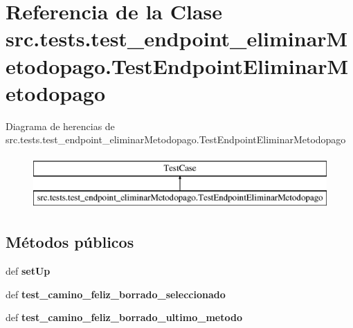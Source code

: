\hypertarget{classsrc_1_1tests_1_1test__endpoint__eliminar_metodopago_1_1_test_endpoint_eliminar_metodopago}{\section{Referencia de la Clase src.\-tests.\-test\-\_\-endpoint\-\_\-eliminar\-Metodopago.\-Test\-Endpoint\-Eliminar\-Metodopago}
\label{classsrc_1_1tests_1_1test__endpoint__eliminar_metodopago_1_1_test_endpoint_eliminar_metodopago}
}
Diagrama de herencias de src.\-tests.\-test\-\_\-endpoint\-\_\-eliminar\-Metodopago.\-Test\-Endpoint\-Eliminar\-Metodopago\begin{figure}[H]
\begin{center}
\leavevmode
\includegraphics[height=2.000000cm]{classsrc_1_1tests_1_1test__endpoint__eliminar_metodopago_1_1_test_endpoint_eliminar_metodopago}
\end{center}
\end{figure}
\subsection*{Métodos públicos}
\begin{DoxyCompactItemize}
\item 
\hypertarget{classsrc_1_1tests_1_1test__endpoint__eliminar_metodopago_1_1_test_endpoint_eliminar_metodopago_ac2cf7471b5e0f405b1380085baf73551}{def {\bfseries set\-Up}}\label{classsrc_1_1tests_1_1test__endpoint__eliminar_metodopago_1_1_test_endpoint_eliminar_metodopago_ac2cf7471b5e0f405b1380085baf73551}

\item 
\hypertarget{classsrc_1_1tests_1_1test__endpoint__eliminar_metodopago_1_1_test_endpoint_eliminar_metodopago_abd41a3233d33dfabbc36cca40e17cc72}{def {\bfseries test\-\_\-camino\-\_\-feliz\-\_\-borrado\-\_\-seleccionado}}\label{classsrc_1_1tests_1_1test__endpoint__eliminar_metodopago_1_1_test_endpoint_eliminar_metodopago_abd41a3233d33dfabbc36cca40e17cc72}

\item 
\hypertarget{classsrc_1_1tests_1_1test__endpoint__eliminar_metodopago_1_1_test_endpoint_eliminar_metodopago_ad74e105cdd137e6735bc0513e1a48ab3}{def {\bfseries test\-\_\-camino\-\_\-feliz\-\_\-borrado\-\_\-ultimo\-\_\-metodo}}\label{classsrc_1_1tests_1_1test__endpoint__eliminar_metodopago_1_1_test_endpoint_eliminar_metodopago_ad74e105cdd137e6735bc0513e1a48ab3}

\end{DoxyCompactItemize}
